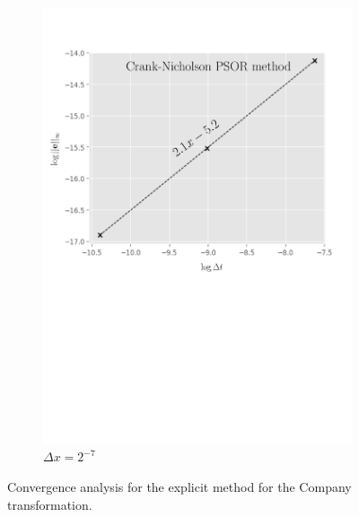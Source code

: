 \begin{figure}[tbp]
\begin{subfigure}{0.4\textwidth}
    \includegraphics[width=\textwidth]{chapters/chapter5/ConvergenceTimeCrankNicholsonLCP.pdf}
    \caption{$\Delta{t}=2^{-15},2^{-17},\dots,2^{-21}$}
    \caption*{$\Delta{x}=2^{-7}$}
    \label{fig:lcp:numericalresults:convergence_time_cranknicholson}
  \end{subfigure}
  \caption{Convergence analysis for the explicit method for the Company transformation.}
  \label{fig:lcp:numericalresults:cranknicholson_convergence_analysis}
\end{figure}